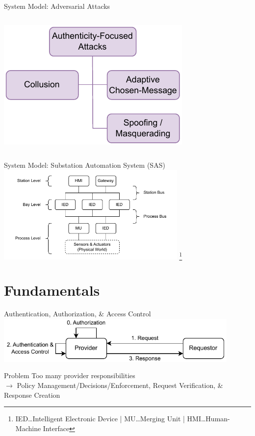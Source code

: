 \documentclass[en]{sdqbeamer}
\newcommand\nonumberfootnote[1]{%
  \begingroup
  \renewcommand\thefootnote{}\footnote{#1}%
  \addtocounter{footnote}{-1}%
  \endgroup
}
\begin{document}
\begin{frame}{System Model: Adversarial Attacks}
\begin{columns}
        \centering
        \includegraphics[width=\linewidth]{figures/attacks_authenticity.drawio.pdf}
    \end{columns}
\end{frame}
\begin{frame}{System Model: Substation Automation System (SAS)}
    \centering
    \includegraphics[width=0.7\textwidth]{./figures/substation_architecture.drawio.pdf}
    \nonumberfootnote{IED\dots Intelligent Electronic Device | MU\dots Merging Unit | HMI\dots Human-Machine Interface}
\end{frame}

\section{Fundamentals}
\begin{frame}{Authentication, Authorization, \& Access Control}
    \centering
	\includegraphics[width=0.9\textwidth]{./figures/access_control_request_traditional.drawio.pdf}
    \begin{redblock}{Problem}
        Too many provider responsibilities
        \\$\rightarrow$ Policy Management/Decisions/Enforcement, Request Verification, \& Response Creation
    \end{redblock}
\end{frame}
\end{document}
